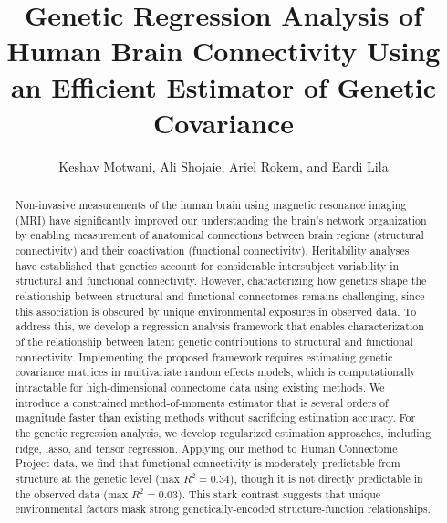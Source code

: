 \documentclass[12pt]{article}
\title{Genetic Regression Analysis  of Human Brain Connectivity Using an Efficient Estimator of Genetic Covariance}
\author{Keshav Motwani, Ali Shojaie, Ariel Rokem, and Eardi Lila}
\date{}{}
\begin{document}
\def\spacingset#1{\renewcommand{\baselinestretch}%
{#1}\small\normalsize} \spacingset{1}

\maketitle

\vspace{-6mm}

\begin{abstract}


\noindent Non-invasive measurements of the human brain using magnetic resonance imaging (MRI) have significantly improved our understanding the brain's network organization by enabling measurement of anatomical connections between brain regions (structural connectivity) and their coactivation (functional connectivity).
Heritability analyses have established that genetics account for considerable intersubject variability in structural and functional connectivity. However, characterizing how genetics shape the relationship between structural and functional connectomes remains challenging, since this association is obscured by unique environmental exposures in observed data. To address this, we develop a regression analysis framework that enables characterization of the relationship between latent genetic contributions to structural and functional connectivity. Implementing the proposed framework requires estimating genetic covariance matrices in multivariate random effects models, which is computationally intractable for high-dimensional connectome data using existing methods. We introduce a constrained method-of-moments estimator that is several orders of magnitude faster than existing methods without sacrificing estimation accuracy. For the genetic regression analysis, we develop regularized estimation approaches, including ridge, lasso, and tensor regression. Applying our method to Human Connectome Project data, we find that functional connectivity is moderately predictable from structure at the genetic level (max $R^2
= 0.34$), though it is not directly predictable in the observed data (max $R^2 = 0.03$). This stark contrast suggests that unique environmental factors mask strong genetically-encoded structure-function relationships.
\end{abstract}




\end{document}

